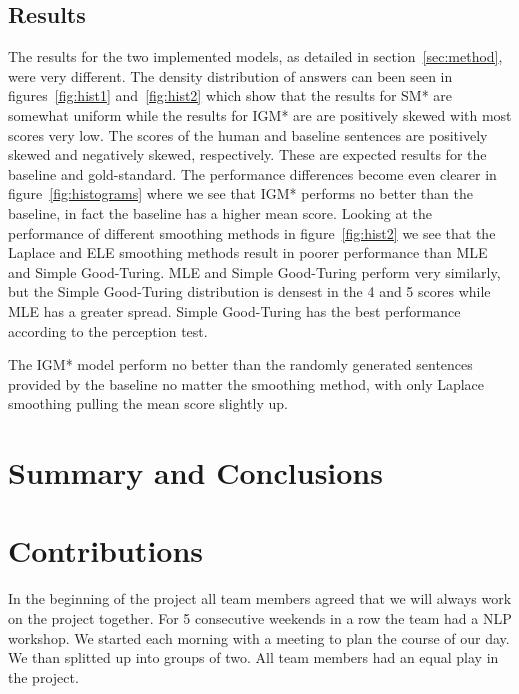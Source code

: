 \documentclass[a4paper,12pt]{article}
\begin{document}
\subsection{Results}
\label{sec:results}
The results for the two implemented models, as detailed in section~\ref{sec:method}, were very different. The density distribution of answers can been seen in figures~\ref{fig:hist1} and~\ref{fig:hist2} which show that the results for SM* are somewhat uniform while the results for IGM* are are positively skewed with most scores very low. The scores of the human and baseline sentences are positively skewed and negatively skewed, respectively. These are expected results for the baseline and gold-standard. The performance differences become even clearer in figure~\ref{fig:histograms} where we see that IGM* performs no better than the baseline, in fact the baseline has a higher mean score. Looking at the performance of different smoothing methods in figure~\ref{fig:hist2} we see that the Laplace and ELE smoothing methods result in poorer performance than MLE and Simple Good-Turing. MLE and Simple Good-Turing perform very similarly, but the Simple Good-Turing distribution is densest in the 4 and 5 scores while MLE has a greater spread. Simple Good-Turing has the best performance according to the perception test.

The IGM* model perform no better than the randomly generated sentences provided by the baseline no matter the smoothing method, with only Laplace smoothing pulling the mean score slightly up.



\section{Summary and Conclusions}
\label{sec:summary}


\section{Contributions}
\label{sec:contributions}
In the beginning of the project all team members agreed that we will always work on the project together. For 5 consecutive weekends in a row the team had a NLP workshop. We started each morning with a meeting to plan  the course of our day. We than splitted up into groups of two. All team members had an equal play in the project.

\clearpage


\end{document}
